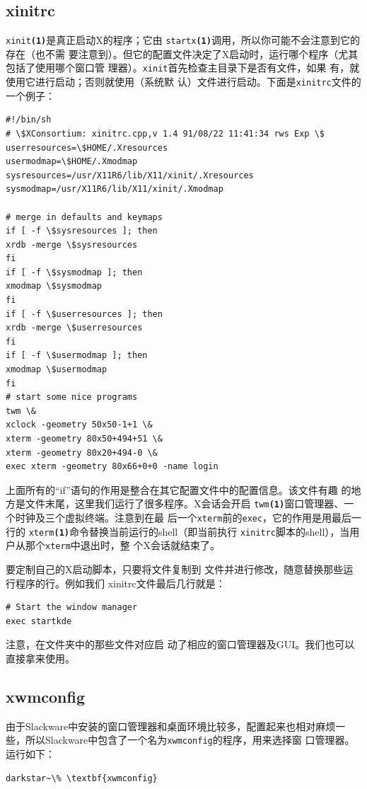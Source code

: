 \subsection{xinitrc}
\label{chap:xconfiguration:select:xinitrc}
\texttt{xinit\textbf{(1)}}是真正启动X的程序；它由
\texttt{startx\textbf{(1)}}调用，所以你可能不会注意到它的存在（也不需
要注意到）。但它的配置文件决定了X启动时，运行哪个程序（尤其包括了使用哪个窗口管
理器）。\texttt{xinit}首先检查主目录下是否有文件，如果
有，就使用它进行启动；否则就使用（系统默
认）文件进行启动。下面是\texttt{xinitrc}文件的一个例子：
\begin{Verbatim}[frame=single, commandchars=\\\{\}]
#!/bin/sh
# \$XConsortium: xinitrc.cpp,v 1.4 91/08/22 11:41:34 rws Exp \$
userresources=\$HOME/.Xresources
usermodmap=\$HOME/.Xmodmap
sysresources=/usr/X11R6/lib/X11/xinit/.Xresources
sysmodmap=/usr/X11R6/lib/X11/xinit/.Xmodmap

# merge in defaults and keymaps
if [ -f \$sysresources ]; then
xrdb -merge \$sysresources
fi
if [ -f \$sysmodmap ]; then
xmodmap \$sysmodmap
fi
if [ -f \$userresources ]; then
xrdb -merge \$userresources
fi
if [ -f \$usermodmap ]; then
xmodmap \$usermodmap
fi
# start some nice programs
twm \&
xclock -geometry 50x50-1+1 \&
xterm -geometry 80x50+494+51 \&
xterm -geometry 80x20+494-0 \&
exec xterm -geometry 80x66+0+0 -name login
\end{Verbatim}

上面所有的``if''语句的作用是整合在其它配置文件中的配置信息。该文件有趣
的地方是文件末尾，这里我们运行了很多程序。X会话会开启
\texttt{twm\textbf{(1)}}窗口管理器、一个时钟及三个虚拟终端。注意到在最
后一个\texttt{xterm}前的\texttt{exec}，它的作用是用最后一行的
\texttt{xterm\textbf{(1)}}命令替换当前运行的shell（即当前执行
\texttt{xinitrc}脚本的shell），当用户从那个\texttt{xterm}中退出时，整
个X会话就结束了。

要定制自己的X启动脚本，只要将文件复制到
文件并进行修改，随意替换那些运行程序的行。例如我们
xinitrc文件最后几行就是：
\begin{Verbatim}[frame=single, commandchars=\\\{\}]
# Start the window manager
exec startkde
\end{Verbatim}
注意，在文件夹中的那些文件对应启
动了相应的窗口管理器及GUI。我们也可以直接拿来使用。

\subsection{xwmconfig}
\label{chap:xconfiguration:select:xwmconfig}
由于Slackware中安装的窗口管理器和桌面环境比较多，配置起来也相对麻烦一
些，所以Slackware中包含了一个名为\texttt{xwmconfig}的程序，用来选择窗
口管理器。运行如下：
\begin{Verbatim}[frame=single, commandchars=\\\{\}]
darkstar~\% \textbf{xwmconfig}
\end{Verbatim}

